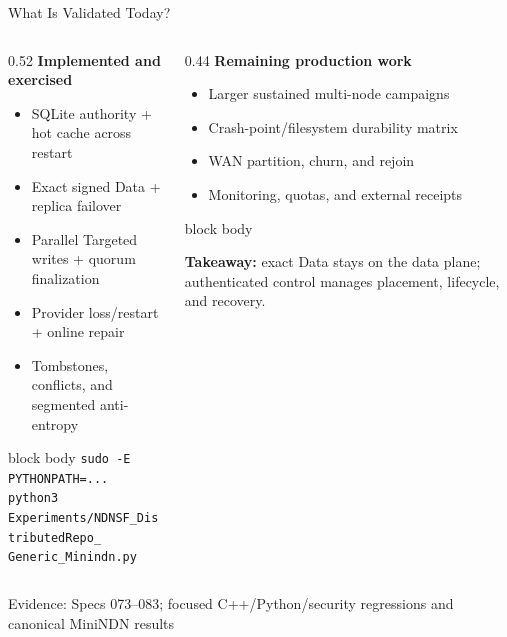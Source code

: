 \documentclass[aspectratio=169]{beamer}
\newcommand{\bluebox}[1]{%
  \begin{beamercolorbox}[rounded=true,shadow=false,sep=0.65em,wd=\linewidth]{block body}
  #1
  \end{beamercolorbox}
}
\newcommand{\evidence}[1]{%
  \vfill\par\noindent
  {\color{SoftGray}\tiny Evidence: #1}\par
}
\begin{document}
\begin{frame}{What Is Validated Today?}
\footnotesize
\begin{columns}[T]
\begin{column}{0.52\textwidth}
\textbf{Implemented and exercised}
\begin{itemize}
  \item SQLite authority + hot cache across restart
  \item Exact signed Data + replica failover
  \item Parallel Targeted writes + quorum finalization
  \item Provider loss/restart + online repair
  \item Tombstones, conflicts, and segmented anti-entropy
\end{itemize}

\vspace{0.25em}
\begin{beamercolorbox}[sep=0.55em,wd=\linewidth]{block body}
\tiny
\texttt{sudo -E PYTHONPATH=... python3}\\
\texttt{Experiments/NDNSF\_DistributedRepo\_}\\
\texttt{Generic\_Minindn.py}
\end{beamercolorbox}
\end{column}
\begin{column}{0.44\textwidth}
\textbf{Remaining production work}
\begin{itemize}
  \item Larger sustained multi-node campaigns
  \item Crash-point/filesystem durability matrix
  \item WAN partition, churn, and rejoin
  \item Monitoring, quotas, and external receipts
\end{itemize}

\vspace{0.35em}
\bluebox{
\textbf{Takeaway:} exact Data stays on the data plane; authenticated control manages placement, lifecycle, and recovery.
}
\end{column}
\end{columns}
\evidence{Specs 073--083; focused C++/Python/security regressions and canonical MiniNDN results}
\end{frame}
\end{document}
